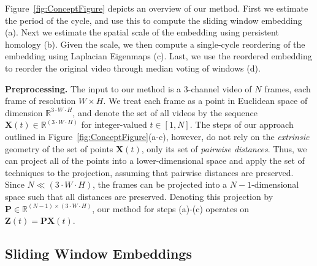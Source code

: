 \documentclass{article}
\newcommand{\mb}{\mathbf}
\begin{document}
Figure~\ref{fig:ConceptFigure} depicts an overview of our method. First we estimate the period of the cycle, and use this to compute the sliding window embedding (a). Next we estimate the spatial scale of the embedding using persistent homology (b). Given the scale, we then compute a single-cycle reordering of the embedding using Laplacian Eigenmaps (c). Last, we use the reordered embedding to reorder the original video through median voting of windows (d).

\textbf{Preprocessing.} The input to our method is a 3-channel video of $N$ frames, each frame of resolution $W \times H$. We treat each frame as a point in Euclidean space of dimension $\mathbb{R}^{3 \cdot W \cdot H}$, and denote the set of all videos by the sequence $\mb{X}(t) \in \mathbb{R}^{(3 \cdot W \cdot H)}$ for integer-valued $t \in [1,N]$. The steps of our approach outlined in Figure~\ref{fig:ConceptFigure}(a-c), however, do not rely on the {\em extrinsic} geometry of the set of points $\mb{X}(t)$, only its set of {\em pairwise distances}. Thus, we can project all of the points into a lower-dimensional space and apply the set of techniques to the projection, assuming that pairwise distances are preserved. Since $N \ll (3 \cdot W \cdot H)$, the frames can be projected into a $N-1$-dimensional space such that all distances are preserved. Denoting this projection by $\mb{P} \in \mathbb{R}^{(N-1) \times (3 \cdot W \cdot H)}$, our method for steps (a)-(c) operates on $\mb{Z}(t) = \mb{P} \mb{X}(t)$.


\subsection{Sliding Window Embeddings}
\label{sec:slidingwindow}
\end{document}
